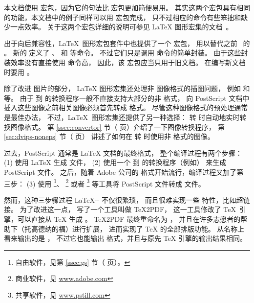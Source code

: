 本文档使用  宏包，因为它的句法比  宏包更加简便易用。
其实这两个宏包具有相同的功能，本文档中的例子同样可以用  宏包完成，
只不过相应的命令有些笨拙和缺少一点效率。
关于这两个宏包详细的说明可参见 \LaTeX{} 图形宏集的文档~\cite{grfguide}。

出于向后兼容性，\LaTeX\ 图形宏包套件中也提供了一个  宏包，
用以替代之前 \LaTeXe\ 的 。
新的 定义了 、 和  等命令。
不过它们只是调用  命令的简单封装。
由于这些封装效率没有直接使用  命令高，
因此，该  宏包应当只用于旧文档。
在编写新文档时要用 。

除了改进  图片的部分，
\LaTeX{} 图形宏集还处理非  图像格式的插图问题，
例如 和 等。
由于  到  的转换程序一般不直接支持大部分的非 格式，
向 PostScript 文档中插入这些图像之前相关图像必须首先转成  格式。
尽管这种图像格式的预处理通常是最佳办法，
不过，\LaTeX\ 图形宏集还提供了另一种选择： 转  时自动地实时转换图像格式。
第 \ref{ssec:convertor} 节（\pageref{ssec:convertor} 页）介绍了一下图像转换程序，
第 \ref{sec:dvips-noneps} 节（\pageref{sec:dvips-noneps} 页） 讲述了如何在  转  时使用非  格式的图像。

过去，PostScript 通常是 \LaTeX{} 文档的最终格式，
\marginpar{\pdfTeX}
整个编译过程有两个步骤：
(1) 使用 \LaTeX{} 生成  文件，
(2) 使用一个  到  的转换程序（例如） 来生成 PostScript 文件。
之后，随着 Adobe 公司的  格式开始流行，编译过程又加了第三步：
(3) 使用 \footnote{
    自由软件，见第 \ref{ssec:gs} 节（\pageref{ssec:gs} 页）。}、
\footnote{
    商业软件，见 \url{www.adobe.com}}
或者 \footnote{
    共享软件，见 \url{www.pstill.com}}
等工具将 PostScript 文件转成  文件。

然而，这种三步骤过程 \LaTeX-- 不仅很繁琐，
而且很难实现一些  特性，比如超链接。
为了改进这一点，\HanTheThanh{} 写了一个工具叫做 \TeX2PDF，
这一工具修改了 \TeX\ 引擎，可以直接从 \TeX{} 生成 。
\TeX2PDF 最终重命名为 \pdfTeX，
并且在许多志愿者的帮助下（托高德纳的福）进行扩展，
进而实现了 \TeX{} 的全部排版功能。
\pdfTeX 从名称上看来输出的是 ，
不过它也能输出  格式，并且与原先 \TeX{} 引擎的输出结果相同。

